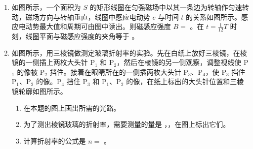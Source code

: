 \documentclass[\gkver]{gaokaozhenti}
\begin{document}
\begin{enumerate}


\item
如图所示，一个面积为 $S$ 的矩形线圈在匀强磁场中以其一条边为转轴作匀速转动，磁场方向与转轴垂直，线圈中感应电动势 $e$ 与时间 $t$ 的关系如图所示。感应电动势最大值和周期可由图中读出。则磁感应强度 $B =$ 。在 $t = \frac{1}{12}T$ 时刻，线圈平面与磁感应强度的夹角等于 。
\onepicture[align=right, w=5cm]{}



\item
如图所示，用三棱镜做测定玻璃折射率的实验。先在白纸上放好三棱镜，在棱镜的一侧插上两枚大头针 P$_{1}$ 和 P$_{2}$，然后在棱镜的另一侧观察，调整视线使 P$_{1}$ 的像被 P$_{2}$ 挡住。接着在眼睛所在的一侧插两枚大头针 P$_{3}$、P$_{4}$，使 P$_{3}$ 挡住 P$_{1}$、P$_{2}$ 的像。P$_{4}$ 挡住 P$_{3}$ 和 P$_{1}$、P$_{2}$ 的像，在纸上标出的大头针位置和三棱镜轮廓如图所示。
\begin{enumerate}
	\item
	在本题的图上画出所需的光路。
	\item
	为了测出棱镜玻璃的折射率，需要测量的量是 ，，在图上标出它们。
	\item
	计算折射率的公式是 $n =$ 。
\end{enumerate}


\end{enumerate}
\end{document}
